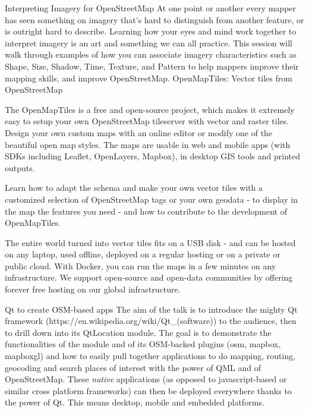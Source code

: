 
%
{Interpreting Imagery for OpenStreetMap}%
{}%
{%
  At one point or another every mapper has seen something on imagery that’s hard to distinguish from
  another feature, or is outright hard to describe.  Learning how your eyes and mind work together
  to interpret imagery is an art and something we can all practice.  This session will walk through
  examples of how you can associate imagery characteristics such as Shape, Size, Shadow, Time,
  Texture, and Pattern to help mappers improve their mapping skills, and improve OpenStreetMap.  %
}
%
{OpenMapTiles: Vector tiles from OpenStreetMap}%
{}%
{%
  The OpenMapTiles is a free and open-source project, which makes it extremely easy to setup your
  own OpenStreetMap tileserver with vector and raster tiles. Design your own custom maps with an
  online editor or modify one of the beautiful open map styles. The maps are usable in web and
  mobile apps (with SDKs including Leaflet, OpenLayers, Mapbox), in desktop GIS tools and printed
  outputs.

  Learn how to adapt the schema and make your own vector tiles with a customized selection of
  OpenStreetMap tags or your own geodata - to display in the map the features you need - and how to
  contribute to the development of OpenMapTiles.
  
  The entire world turned into vector tiles fits on a USB disk - and can be hosted on any laptop, used
  offline, deployed on a regular hosting or on a private or public cloud. With Docker, you can run the
  maps in a few minutes on any infrastructure. We support open-source and open-data communities by
  offering forever free hosting on our global infrastructure.%
}
%
{Qt to create OSM-based apps}%
{}%
{%
  The aim of the talk is to introduce the mighty Qt framework
  (https://en.wikipedia.org/wiki/Qt\_(software)) to the audience, then to drill down into its
  QtLocation module.  The goal is to demonstrate the functionalities of the module and of its
  OSM-backed plugins (osm, mapbox, mapboxgl) and how to easily pull together applications to do
  mapping, routing, geocoding and search places of interest with the power of QML and of
  OpenStreetMap.  These \emph{native} applications (as opposed to javascript-based or similar cross
  platform frameworks) can then be deployed everywhere thanks to the power of Qt. This means
  desktop, mobile and embedded platforms.%
}

